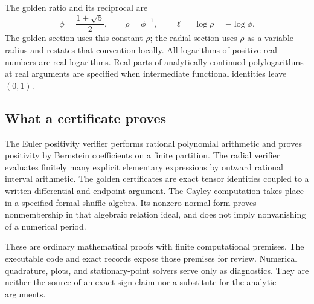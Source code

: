The golden ratio and its reciprocal are
\[
 \phi=\frac{1+\sqrt5}{2},\qquad \rho=\phi^{-1},\qquad
 \ell=\log\rho=-\log\phi.
\]
The golden section uses this constant $\rho$; the radial section uses
$\rho$ as a variable radius and restates that convention locally.
All logarithms of positive real numbers are real logarithms. Real
parts of analytically continued polylogarithms at real arguments are
specified when intermediate functional identities leave $(0,1)$.

\subsection{What a certificate proves}

The Euler positivity verifier performs rational polynomial arithmetic
and proves positivity by Bernstein coefficients on a finite partition.
The radial verifier evaluates finitely many explicit elementary
expressions by outward rational interval arithmetic. The golden
certificates are exact tensor identities coupled to a written
differential and endpoint argument. The Cayley computation takes place
in a specified formal shuffle algebra. Its nonzero normal form proves
nonmembership in that algebraic relation ideal, and does not imply
nonvanishing of a numerical period.

These are ordinary mathematical proofs with finite computational
premises. The executable code and exact records expose those premises
for review. Numerical quadrature, plots, and stationary-point solvers
serve only as diagnostics. They are neither the source of an exact
sign claim nor a substitute for the analytic arguments.
